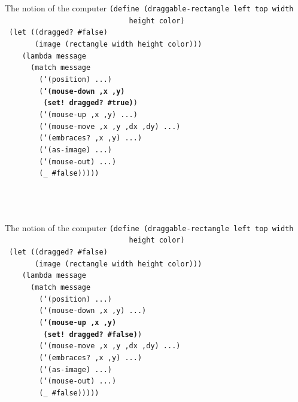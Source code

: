 \documentclass{beamer}
\begin{document}
\begin{frame}{The notion of the computer}
  \small
  \texttt{(define (draggable-rectangle left top width \\
    \ \ \ \ \ \ \ \ \ \ \ \ \ \ \ \ \ \ \ \ \ \ \ \ \ \ \ \ \ height color)\\
    \ (let ((dragged? \#false)\\
  \ \ \ \ \ \ \ (image (rectangle width height color)))\\
  \ \ \ \ (lambda message\\
  \ \ \ \ \ \ (match message\\
  \ \ \ \ \ \ \ \ (`(position) ...)\\
  \ \ \ \ \ \ \ \ (\textbf{`(mouse-down ,x ,y)\\
    \ \ \ \ \ \ \ \ \ (set! dragged? \#true)})\\
  \ \ \ \ \ \ \ \ (`(mouse-up ,x ,y) ...)\\
  \ \ \ \ \ \ \ \ (`(mouse-move ,x ,y ,dx ,dy) ...)\\
  \ \ \ \ \ \ \ \ (`(embraces? ,x ,y) ...)\\
  \ \ \ \ \ \ \ \ (`(as-image) ...)\\
  \ \ \ \ \ \ \ \ (`(mouse-out) ...)\\
  \ \ \ \ \ \ \ \ (\_ \#false)))))\\
  \ \\
  \ \\
  \ 
}
\end{frame}

\begin{frame}{The notion of the computer}
  \small
  \texttt{(define (draggable-rectangle left top width \\
    \ \ \ \ \ \ \ \ \ \ \ \ \ \ \ \ \ \ \ \ \ \ \ \ \ \ \ \ \ height color)\\
    \ (let ((dragged? \#false)\\
  \ \ \ \ \ \ \ (image (rectangle width height color)))\\
  \ \ \ \ (lambda message\\
  \ \ \ \ \ \ (match message\\
  \ \ \ \ \ \ \ \ (`(position) ...)\\
  \ \ \ \ \ \ \ \ (`(mouse-down ,x ,y) ...)\\
  \ \ \ \ \ \ \ \ (\textbf{`(mouse-up ,x ,y) \\
    \ \ \ \ \ \ \ \ \ (set! dragged? \#false)})\\
  \ \ \ \ \ \ \ \ (`(mouse-move ,x ,y ,dx ,dy) ...)\\
  \ \ \ \ \ \ \ \ (`(embraces? ,x ,y) ...)\\
  \ \ \ \ \ \ \ \ (`(as-image) ...)\\
  \ \ \ \ \ \ \ \ (`(mouse-out) ...)\\
  \ \ \ \ \ \ \ \ (\_ \#false)))))\\
  \ \\
  \ \\
  \ 
}
\end{frame}
\end{document}
